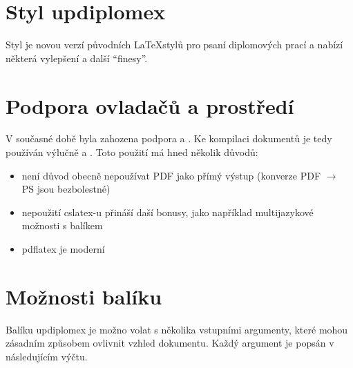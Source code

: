 \documentclass[a4paper,12pt]{article}
\begin{document}
\upmaketitle

\upthanksanot

\uptocandlists

\section{Styl updiplomex}
Styl  je novou verzí původních \LaTeX stylů pro psaní diplomových prací a nabízí některá vylepšení a další \enquote{finesy}.

\section{Podpora ovladačů a prostředí}
V současné době byla zahozena podpora  a . Ke kompilaci dokumentů je tedy používán výlučně  a . Toto použití má hned několik důvodů:
\begin{itemize}
\item není důvod obecně nepoužívat PDF jako přímý výstup (konverze PDF $\rightarrow$ PS jsou bezbolestné)
\item nepoužití cslatex-u přináší daší bonusy, jako například multijazykové možnosti s balíkem 
\item pdflatex je moderní
\end{itemize}

\section{Možnosti balíku}

Balíku updiplomex je možno volat s několika vstupními argumenty, které mohou zásadním způsobem ovlivnit vzhled dokumentu. Každý argument je popsán v následujícím výčtu.
\end{document}
